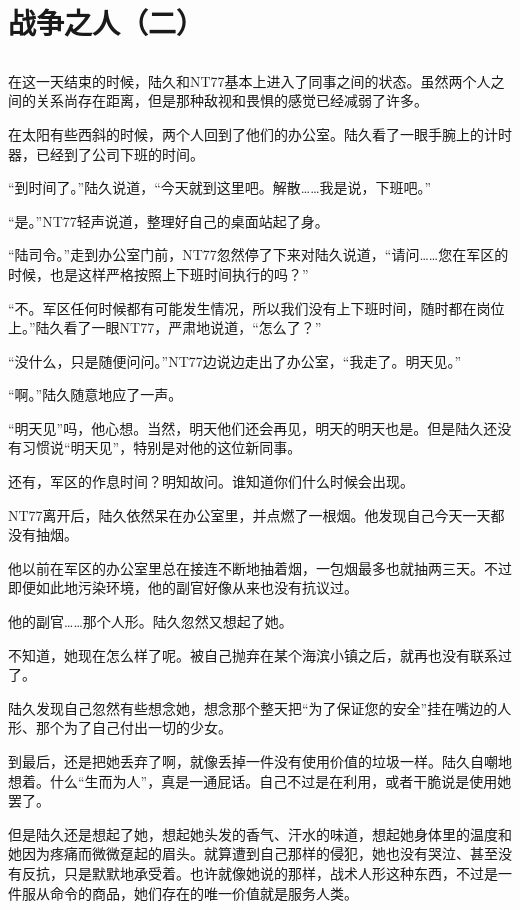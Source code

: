 \chapter{战争之人（二）}

\section*{}

在这一天结束的时候，陆久和NT77基本上进入了同事之间的状态。虽然两个人之间的关系尚存在距离，但是那种敌视和畏惧的感觉已经减弱了许多。

在太阳有些西斜的时候，两个人回到了他们的办公室。陆久看了一眼手腕上的计时器，已经到了公司下班的时间。

“到时间了。”陆久说道，“今天就到这里吧。解散……我是说，下班吧。”

“是。”NT77轻声说道，整理好自己的桌面站起了身。

“陆司令。”走到办公室门前，NT77忽然停了下来对陆久说道，“请问……您在军区的时候，也是这样严格按照上下班时间执行的吗？”

“不。军区任何时候都有可能发生情况，所以我们没有上下班时间，随时都在岗位上。”陆久看了一眼NT77，严肃地说道，“怎么了？”

“没什么，只是随便问问。”NT77边说边走出了办公室，“我走了。明天见。”

“啊。”陆久随意地应了一声。

“明天见”吗，他心想。当然，明天他们还会再见，明天的明天也是。但是陆久还没有习惯说“明天见”，特别是对他的这位新同事。

还有，军区的作息时间？明知故问。谁知道你们什么时候会出现。

NT77离开后，陆久依然呆在办公室里，并点燃了一根烟。他发现自己今天一天都没有抽烟。

他以前在军区的办公室里总在接连不断地抽着烟，一包烟最多也就抽两三天。不过即便如此地污染环境，他的副官好像从来也没有抗议过。

他的副官……那个人形。陆久忽然又想起了她。

不知道，她现在怎么样了呢。被自己抛弃在某个海滨小镇之后，就再也没有联系过了。

陆久发现自己忽然有些想念她，想念那个整天把“为了保证您的安全”挂在嘴边的人形、那个为了自己付出一切的少女。

到最后，还是把她丢弃了啊，就像丢掉一件没有使用价值的垃圾一样。陆久自嘲地想着。什么“生而为人”，真是一通屁话。自己不过是在利用，或者干脆说是使用她罢了。

但是陆久还是想起了她，想起她头发的香气、汗水的味道，想起她身体里的温度和她因为疼痛而微微趸起的眉头。就算遭到自己那样的侵犯，她也没有哭泣、甚至没有反抗，只是默默地承受着。也许就像她说的那样，战术人形这种东西，不过是一件服从命令的商品，她们存在的唯一价值就是服务人类。

